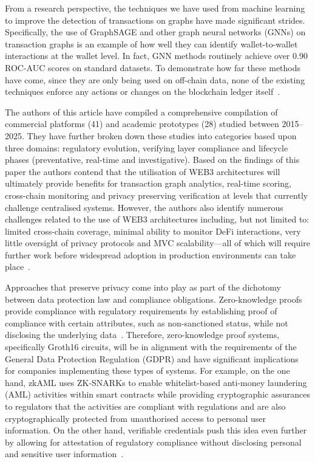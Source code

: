 \documentclass[journal]{IEEEtran}
\begin{document}
From a research perspective, the techniques we have used from machine learning to improve the detection of transactions on graphs have made significant strides. Specifically, the use of GraphSAGE and other graph neural networks (GNNs) on transaction graphs is an example of how well they can identify wallet-to-wallet interactions at the wallet level. In fact, GNN methods routinely achieve over 0.90 ROC-AUC scores on standard datasets. To demonstrate how far these methods have come, since they are only being used on off-chain data, none of the existing techniques enforce any actions or changes on the blockchain ledger itself~\cite{hamilton2017}.

The authors of this article have compiled a comprehensive compilation of commercial platforms (41) and academic prototypes (28) studied between 2015--2025. They have further broken down these studies into categories based upon three domains: regulatory evolution, verifying layer compliance and lifecycle phases (preventative, real-time and investigative). Based on the findings of this paper the authors contend that the utilisation of WEB3 architectures will ultimately provide benefits for transaction graph analytics, real-time scoring, cross-chain monitoring and privacy preserving verification at levels that currently challenge centralised systems. However, the authors also identify numerous challenges related to the use of WEB3 architectures including, but not limited to: limited cross-chain coverage, minimal ability to monitor DeFi interactions, very little oversight of privacy protocols and MVC scalability---all of which will require further work before widespread adoption in production environments can take place~\cite{mao2025}.

Approaches that preserve privacy come into play as part of the dichotomy between data protection law and compliance obligations. Zero-knowledge proofs provide compliance with regulatory requirements by establishing proof of compliance with certain attributes, such as non-sanctioned status, while not disclosing the underlying data~\cite{groth2016}. Therefore, zero-knowledge proof systems, specifically Groth16 circuits, will be in alignment with the requirements of the General Data Protection Regulation (GDPR) and have significant implications for companies implementing these types of systems. For example, on the one hand, zkAML uses ZK-SNARKs to enable whitelist-based anti-money laundering (AML) activities within smart contracts while providing cryptographic assurances to regulators that the activities are compliant with regulations and are also cryptographically protected from unauthorised access to personal user information. On the other hand, verifiable credentials push this idea even further by allowing for attestation of regulatory compliance without disclosing personal and sensitive user information~\cite{alego2025}.
\end{document}
